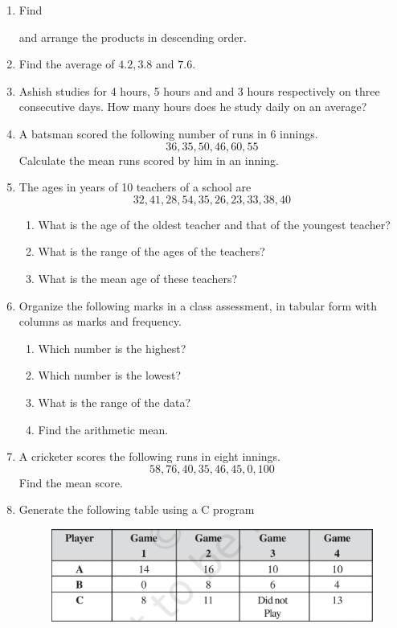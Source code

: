 \begin{enumerate}[label=\thesection.\arabic*, ref=\thesection.\theenumi]
\item Find
	\begin{enumerate}
	\begin{multicols}{3}
	\item $2.7\times 4$
	\item $1.8\times 1.2$
	\item $2.3\times 4.35$
	\end{multicols}
	\end{enumerate}
and arrange the products in descending order.
\item Find the average of $4.2, 3.8$ and $7.6$.
\item Ashish studies for 4 hours, 5 hours and and 3 hours respectively on three consecutive days.  How many hours does he study daily on an average?
\item A batsman scored the following number of runs in 6 innings.  
	$$36, 35, 50, 46, 60, 55$$
	Calculate the mean runs scored by him in an inning.
\item The ages in years of 10 teachers of a school are
	$$32, 41, 28, 54, 35, 26, 23, 33, 38, 40$$
	\begin{enumerate}
		\item What is the age of the oldest teacher and that of the youngest teacher?
		\item What is the range of the ages of the teachers?
		\item What is the mean age of these teachers?
	\end{enumerate}
\item Organize the following marks in a class assessment, in tabular form with columns as marks and frequency.
	\begin{enumerate}
		\item Which number is the highest?
		\item Which number is the lowest?
		\item What is the range of the data?
		\item Find the arithmetic mean.
	\end{enumerate}
\item A cricketer scores the following runs in eight innings.
	$$58, 76, 40, 35, 46, 45, 0, 100$$
	Find the mean score.
\item Generate the following table using a C program
	\begin{figure}[H]
  \centering
  \includegraphics[width=\columnwidth]{figs/data.jpg}

\end{figure}
\end{enumerate}
